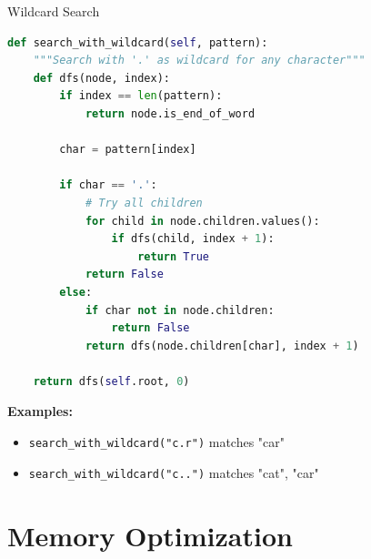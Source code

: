 \documentclass[aspectratio=169]{beamer}
\begin{document}
\begin{frame}[fragile]{Wildcard Search}
  \begin{lstlisting}[language=Python, basicstyle=\ttfamily\footnotesize]
def search_with_wildcard(self, pattern):
    """Search with '.' as wildcard for any character"""
    def dfs(node, index):
        if index == len(pattern):
            return node.is_end_of_word

        char = pattern[index]

        if char == '.':
            # Try all children
            for child in node.children.values():
                if dfs(child, index + 1):
                    return True
            return False
        else:
            if char not in node.children:
                return False
            return dfs(node.children[char], index + 1)

    return dfs(self.root, 0)
  \end{lstlisting}

  \vspace{0.3cm}
  \textbf{Examples:}
  \begin{itemize}
    \item \texttt{search\_with\_wildcard("c.r")} matches "car"
    \item \texttt{search\_with\_wildcard("c..")} matches "cat", "car"
  \end{itemize}
\end{frame}

\section{Memory Optimization}
\end{document}
